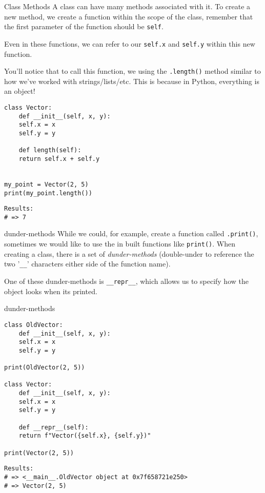 \documentclass[10pt]{beamer}
\begin{document}
\begin{frame}[label={sec:orgec1535d},fragile]{Class Methods}
 A class can have many methods associated with it. To create a new method, we create a
function within the scope of the class, remember that the first parameter of the
function should be \texttt{self}.

Even in these functions, we can refer to our \texttt{self.x} and \texttt{self.y} within this new
function.

You'll notice that to call this function, we using the \texttt{.length()} method similar to
how we've worked with strings/lists/etc. This is because in Python, everything is an
object!

\begin{verbatim}
class Vector:
    def __init__(self, x, y):
	self.x = x
	self.y = y

    def length(self):
	return self.x + self.y


my_point = Vector(2, 5)
print(my_point.length())
\end{verbatim}

\begin{verbatim}
Results: 
# => 7
\end{verbatim}
\end{frame}

\begin{frame}[label={sec:org15e374f},fragile]{dunder-methods}
 While we could, for example, create a function called \texttt{.print()}, sometimes we would
like to use the in built functions like \texttt{print()}. When creating a class, there is a
set of \emph{dunder-methods} (double-under to reference the two '\texttt{\_\_}' characters either side
of the function name).

One of these dunder-methods is \texttt{\_\_repr\_\_}, which allows us to specify how the object
looks when its printed.
\end{frame}

\begin{frame}[label={sec:orgf922e11},fragile]{dunder-methods}
 \begin{verbatim}
class OldVector:
    def __init__(self, x, y):
	self.x = x
	self.y = y

print(OldVector(2, 5))

class Vector:
    def __init__(self, x, y):
	self.x = x
	self.y = y

    def __repr__(self):
	return f"Vector({self.x}, {self.y})"

print(Vector(2, 5))
\end{verbatim}

\begin{verbatim}
Results: 
# => <__main__.OldVector object at 0x7f658721e250>
# => Vector(2, 5)
\end{verbatim}
\end{frame}
\end{document}
